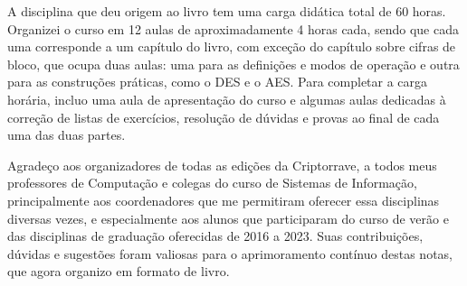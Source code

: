 A disciplina que deu origem ao livro tem uma carga didática total de 60 horas.
Organizei o curso em 12 aulas de aproximadamente 4 horas cada, sendo que cada uma corresponde a um capítulo do livro, com exceção do capítulo sobre cifras de bloco, que ocupa duas aulas:
uma para as definições e modos de operação e outra para as construções práticas, como o DES e o AES.
Para completar a carga horária, incluo uma aula de apresentação do curso e algumas aulas dedicadas à correção de listas de exercícios, resolução de dúvidas e provas ao final de cada uma das duas partes.

Agradeço aos organizadores de todas as edições da Criptorrave, a todos meus professores de Computação e colegas do curso de Sistemas de Informação, principalmente aos coordenadores que me permitiram oferecer essa disciplinas diversas vezes, e especialmente aos alunos que participaram do curso de verão e das disciplinas de graduação oferecidas de 2016 a 2023.
Suas contribuições, dúvidas e sugestões foram valiosas para o aprimoramento contínuo destas notas, que agora organizo em formato de livro.



